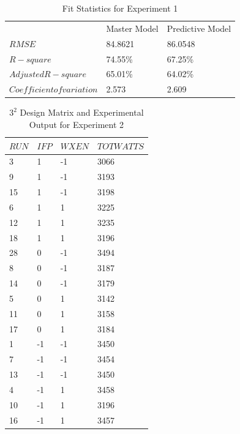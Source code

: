 \documentclass[preprint]{sigplanconf}
\begin{document}
\begin{table}
  \centering
  \label{tab:FitStatsExperiment1}
  \begin{tabular}{l|ll}
    &Master Model&Predictive Model \\
    $RMSE$&84.8621&86.0548 \\
    $R-square$&74.55\%&67.25\% \\
    $Adjusted R-square$&65.01\%&64.02\% \\
    $Coefficient of variation$&2.573&2.609 \\
  \end{tabular}
  \caption{Fit Statistics for Experiment 1}
\end{table}
\clearpage
\begin{table}
  \centering
  \begin{tabular}{l|ll|l}
    $RUN$&$IFP$&$WXEN$&$TOTWATTS$ \\
    \hline
    3&1&-1&3066\\
    9&1&-1&3193\\
    15&1&-1&3198\\
    6&1&1&3225\\
    12&1&1&3235\\
    18&1&1&3196\\
    28&0&-1&3494\\
    8&0&-1&3187\\
    14&0&-1&3179\\
    5&0&1&3142\\
    11&0&1&3158\\
    17&0&1&3184\\
    1&-1&-1&3450\\
    7&-1&-1&3454\\
    13&-1&-1&3450\\
    4&-1&1&3458\\
    10&-1&1&3196\\
    16&-1&1&3457\\
  \end{tabular}
  \caption{\(3^{2}\) Design Matrix and Experimental Output for Experiment 2}
  \label{tab:ExperimentDesign2}
\end{table}
\end{document}
